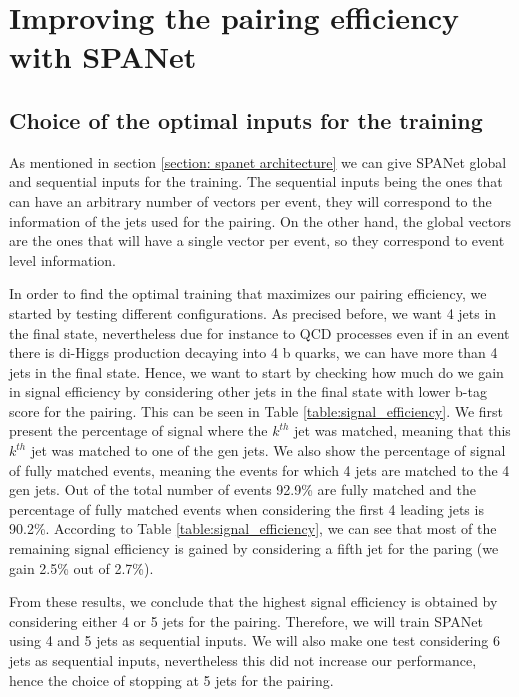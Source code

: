 \section{Improving the pairing efficiency with SPANet}


\subsection{Choice of the optimal inputs for the training}
As mentioned in section \ref{section: spanet architecture} we can give SPANet global and sequential inputs for the training. The sequential inputs being the ones that can have an arbitrary number of vectors per event, they will correspond to the information of the jets used for the pairing. On the other hand, the global vectors are the ones that will have a single vector per event, so they correspond to event level information.

In order to find the optimal training that maximizes our pairing efficiency, we started by testing different configurations. As precised before, we want 4 jets in the final state, nevertheless due for instance to QCD processes even if in an event there is di-Higgs production decaying into 4 b quarks, we can have more than 4 jets in the final state. Hence, we want to start by checking how much do we gain in signal efficiency by considering other jets in the final state with lower b-tag score for the pairing. This can be seen in Table \ref{table:signal_efficiency}. We first present the percentage of signal where the $k^{th}$ jet was matched, meaning that this $k^{th}$ jet was matched to one of the gen jets. We also show the percentage of signal of fully matched events, meaning the events for which 4 jets are matched to the 4 gen jets. Out of the total number of events 92.9\% are fully matched and the percentage of fully matched events when considering the first 4 leading jets is 90.2\%. According to Table \ref{table:signal_efficiency}, we can see that most of the remaining signal efficiency is gained by considering a fifth jet for the paring (we gain 2.5\% out of 2.7\%). 

From these results, we conclude that the highest signal efficiency is obtained by considering either 4 or 5 jets for the pairing. Therefore, we will train SPANet using 4 and 5 jets as sequential inputs. We will also make one test considering 6 jets as sequential inputs, nevertheless this did not increase our performance, hence the choice of stopping at 5 jets for the pairing.


